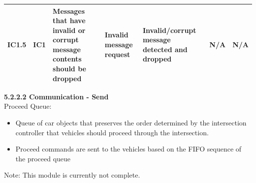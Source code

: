 \documentclass [10pt]{article}
\begin{document}
\begin{longtable}{ | p{ } | p{ } |  p{ } |  p{ } | p{ } | p{ } |  p{ } |}
    
    \multicolumn{1}{|c|}{IC1.5} 
    & \multicolumn{1}{c|}{IC1}
    & Messages that have invalid or corrupt message contents should be dropped
    & Invalid message \newline request
    & Invalid/corrupt message detected and dropped
    & N/A
    & \multicolumn{1}{c|}{N/A}\\ \hline
     
    \end{longtable}
    
    \textbf{5.2.2.2 Communication - Send}  \\ 
    
    Proceed Queue:
\begin{itemize}[topsep=0pt]
    \itemsep -3pt
    \item Queue of car objects that preserves the order determined by the intersection controller that vehicles should proceed through the intersection. 
    \item Proceed commands are sent to the vehicles based on the FIFO sequence of the proceed queue\\
\end{itemize}

    Note: This module is currently not complete.\\
    
\end{document}
